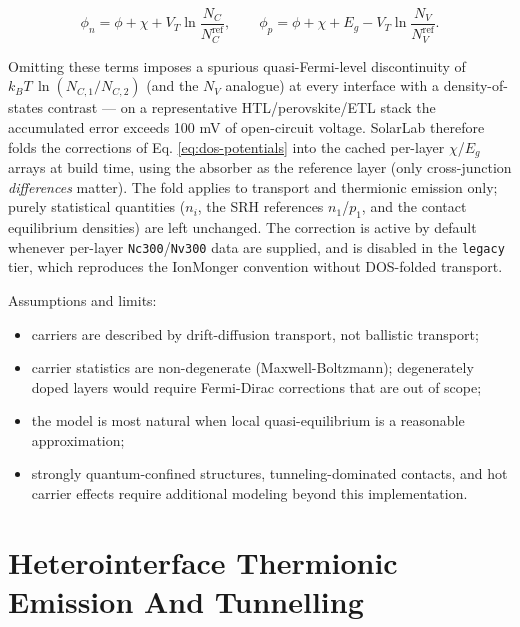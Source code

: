 \documentclass[
  11pt,
  american,
]{report}
\providecommand{\tightlist}{%
  \setlength{\itemsep}{0pt}\setlength{\parskip}{0pt}}
\begin{document}
\begin{equation}
\label{eq:dos-potentials}
\phi_n = \phi + \chi + V_T\ln\!\frac{N_C}{N_C^{\mathrm{ref}}},
\qquad
\phi_p = \phi + \chi + E_g - V_T\ln\!\frac{N_V}{N_V^{\mathrm{ref}}} .
\end{equation}

Omitting these terms imposes a spurious quasi-Fermi-level discontinuity
of \(k_BT\,\ln(N_{C,1}/N_{C,2})\) (and the \(N_V\) analogue) at every
interface with a density-of-states contrast --- on a representative
HTL/perovskite/ETL stack the accumulated error exceeds 100 mV of
open-circuit voltage. SolarLab therefore folds the corrections of Eq.
\ref{eq:dos-potentials} into the cached per-layer \(\chi\)/\(E_g\)
arrays at build time, using the absorber as the reference layer (only
cross-junction \emph{differences} matter). The fold applies to transport
and thermionic emission only; purely statistical quantities (\(n_i\),
the SRH references \(n_1\)/\(p_1\), and the contact equilibrium
densities) are left unchanged. The correction is active by default
whenever per-layer \texttt{Nc300}/\texttt{Nv300} data are supplied, and
is disabled in the \texttt{legacy} tier, which reproduces the IonMonger
convention without DOS-folded transport.

Assumptions and limits:

\begin{itemize}
\tightlist
\item
  carriers are described by drift-diffusion transport, not ballistic
  transport;
\item
  carrier statistics are non-degenerate (Maxwell-Boltzmann);
  degenerately doped layers would require Fermi-Dirac corrections that
  are out of scope;
\item
  the model is most natural when local quasi-equilibrium is a reasonable
  approximation;
\item
  strongly quantum-confined structures, tunneling-dominated contacts,
  and hot carrier effects require additional modeling beyond this
  implementation.
\end{itemize}

\hypertarget{heterointerface-thermionic-emission-and-tunnelling}{%
\section{Heterointerface Thermionic Emission And
Tunnelling}\label{heterointerface-thermionic-emission-and-tunnelling}}
\end{document}
